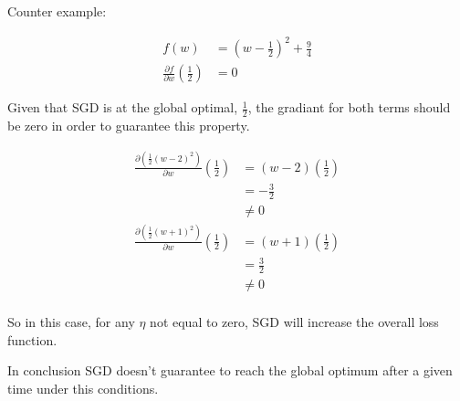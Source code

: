 
Counter example:

\begin{align*}
    f(w) &= (w - \frac{1}{2})^2 + \frac{9}{4} \\
    \frac{\partial f}{\partial w} \left( \frac{1}{2} \right) &=0
\end{align*}

Given that SGD is at the global optimal, $\frac{1}{2}$, the gradiant for both terms should be zero in order to guarantee
this property.

\begin{align*}
    \frac{\partial \left( \frac{1}{2} (w-2)^2 \right)}{\partial w} \left( \frac{1}{2} \right)
    &= (w-2) \left( \frac{1}{2} \right) \\
    &= - \frac{3}{2} \\
    &\neq 0 \\
    \frac{\partial \left( \frac{1}{2} (w+1)^2 \right)}{\partial w} \left( \frac{1}{2} \right)
    &= (w+1) \left( \frac{1}{2} \right) \\
    &= \frac{3}{2} \\
    &\neq 0 \\
\end{align*}

So in this case, for any $\eta$ not equal to zero, SGD will increase the overall loss function.

In conclusion SGD doesn't guarantee to reach the global optimum after a given time under this conditions.

